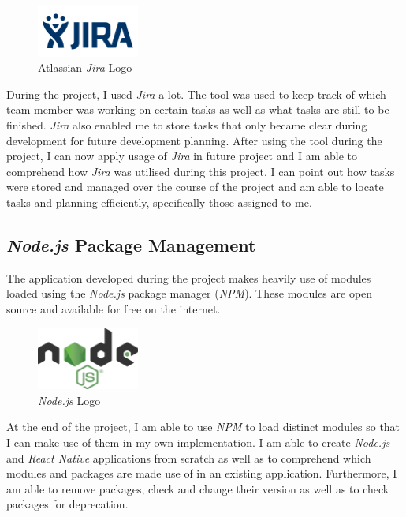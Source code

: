 \begin{figure}[H]
    \centering
    \includegraphics[width=0.3\textwidth]{images/jira-logo.png}
    \caption{Atlassian \textit{Jira} Logo}
    \label{fig:jira_logo}
\end{figure}

During the project, I used \textit{Jira} a lot. The tool was used to keep track of which team member was working on certain tasks as well as what tasks are still to be finished. \textit{Jira} also enabled me to store tasks that only became clear during development for future development planning.
\newline
After using the tool during the project, I can now apply usage of \textit{Jira} in future project and I am able to comprehend how \textit{Jira} was utilised during this project. I can point out how tasks were stored and managed over the course of the project and am able to locate tasks and planning efficiently, specifically those assigned to me.

\subsection{\textit{Node.js} Package Management}
\label{ssec:nodejs_package_management}

The application developed during the project makes heavily use of modules loaded using the \textit{Node.js} package manager (\textit{NPM}). These modules are open source and available for free on the internet.

\begin{figure}[H]
    \centering
    \includegraphics[width=0.3\textwidth]{images/node-js-logo.png}
    \caption{\textit{Node.js} Logo}
    \label{fig:node_js_logo}
\end{figure}

At the end of the project, I am able to use \textit{NPM} to load distinct modules so that I can make use of them in my own implementation. I am able to create \textit{Node.js} and \textit{React Native} applications from scratch as well as to comprehend which modules and packages are made use of in an existing application. Furthermore, I am able to remove packages, check and change their version as well as to check packages for deprecation.

